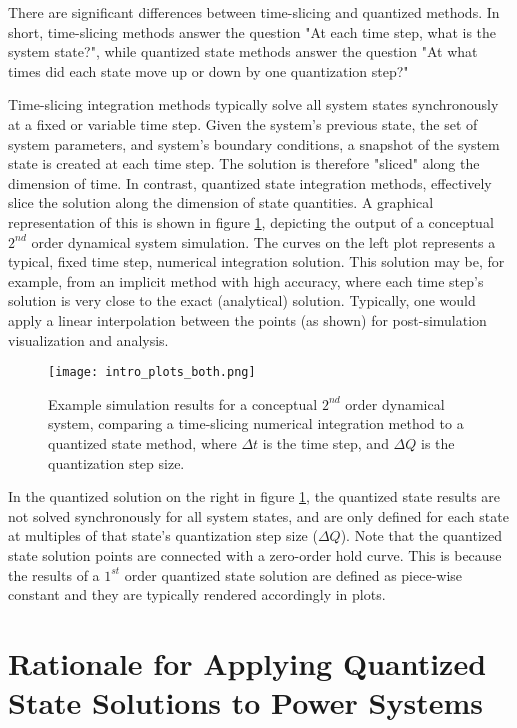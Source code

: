 There are significant differences between time-slicing and  quantized methods. In short, time-slicing methods answer the question "At each time step, what is the system state?", while quantized state methods answer the question "At what times did each state move up or down by one quantization step?"

Time-slicing integration methods typically solve all system states synchronously at a fixed or variable time step. Given the system's previous state, the set of system parameters, and system's boundary conditions, a snapshot of the system state is created at each time step. The solution is therefore "sliced" along the dimension of time. In contrast, quantized state integration methods, effectively slice the solution along the dimension of state quantities. A graphical representation of this is shown in figure \ref{fig:intro_plots_both}, depicting the output of a conceptual $2^{nd}$ order dynamical system simulation. The curves on the left plot represents a typical, fixed time step, numerical integration solution. This solution may be, for example, from an implicit method with high accuracy, where each time step's solution is very close to the exact (analytical) solution. Typically, one would apply a linear interpolation between the points (as shown) for post-simulation visualization and analysis. 

\begin{figure}[ht]
    \centering
    \texttt{[image: intro\_plots\_both.png]}
    \caption{Example simulation results for a conceptual $2^{nd}$ order dynamical system, comparing a time-slicing numerical integration method to a quantized state method, where $\Delta t$ is the time step, and $\Delta Q$ is the quantization step size.}
    \label{fig:intro_plots_both}
\end{figure}

In the quantized solution on the right in figure \ref{fig:intro_plots_both}, the quantized state results are not solved synchronously for all system states, and are only defined for each state at multiples of that state's quantization step size ($\Delta Q$). Note that the quantized state solution points are connected with a zero-order hold curve. This is because the results of a $1^{st}$ order quantized state solution are defined as piece-wise constant \cite{kofman2001b} and they are typically rendered accordingly in plots.

\section{Rationale for Applying Quantized State Solutions to Power Systems}

